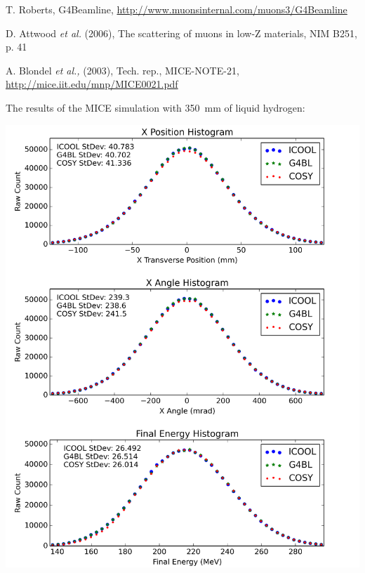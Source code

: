 \documentclass[portrait,a0paper,fontscale=0.285]{baposter} %
\begin{document}
\begin{poster}
{\begin{footnotesize}
\begin{thebibliography}{9}
T. Roberts, G4Beamline, \url{http://www.muonsinternal.com/muons3/G4Beamline}

D. Attwood \emph{et al.} (2006), The scattering of muons in low-Z materials, NIM B251, p. 41

A. Blondel \emph{et al.,} (2003), Tech. rep., MICE-NOTE-21, \url{http://mice.iit.edu/mnp/MICE0021.pdf} 

\end{thebibliography}
\end{footnotesize}
}


{
The results of the MICE simulation with 350~mm of liquid hydrogen:
\begin{center}
\includegraphics[width=\textwidth]{Figures/MICE_LH}
\end{center}

}
\end{poster}
\end{document}
